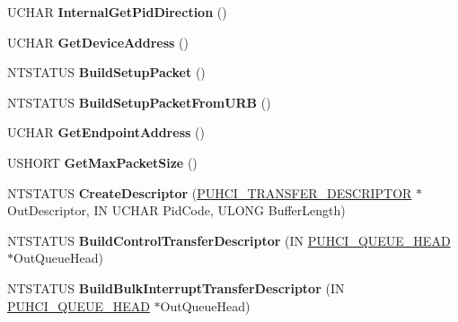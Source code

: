 \begin{DoxyCompactItemize}
\item 
\mbox{\label{class_c_u_s_b_request_a907750f1eae3e8941ed48e267dfa065c}} 
U\+C\+H\+AR {\bfseries Internal\+Get\+Pid\+Direction} ()
\item 
\mbox{\label{class_c_u_s_b_request_a4efd7319fed4233a64a3b07bab79f8eb}} 
U\+C\+H\+AR {\bfseries Get\+Device\+Address} ()
\item 
\mbox{\label{class_c_u_s_b_request_a3b5a481af7c99db9a583bd1442a338f7}} 
N\+T\+S\+T\+A\+T\+US {\bfseries Build\+Setup\+Packet} ()
\item 
\mbox{\label{class_c_u_s_b_request_a368b9e19db90a8cbcc7308c47b559034}} 
N\+T\+S\+T\+A\+T\+US {\bfseries Build\+Setup\+Packet\+From\+U\+RB} ()
\item 
\mbox{\label{class_c_u_s_b_request_aa3ece5c8123ef906c134eeb3ada68c25}} 
U\+C\+H\+AR {\bfseries Get\+Endpoint\+Address} ()
\item 
\mbox{\label{class_c_u_s_b_request_ac79908e17dcded7104b9c2d4cc77d38d}} 
U\+S\+H\+O\+RT {\bfseries Get\+Max\+Packet\+Size} ()
\item 
\mbox{\label{class_c_u_s_b_request_abb2fcd2a0ad93e424d2d3fb0449bf6f4}} 
N\+T\+S\+T\+A\+T\+US {\bfseries Create\+Descriptor} (\hyperlink{struct___u_h_c_i___t_r_a_n_s_f_e_r___d_e_s_c_r_i_p_t_o_r}{P\+U\+H\+C\+I\+\_\+\+T\+R\+A\+N\+S\+F\+E\+R\+\_\+\+D\+E\+S\+C\+R\+I\+P\+T\+OR} $\ast$Out\+Descriptor, IN U\+C\+H\+AR Pid\+Code, U\+L\+O\+NG Buffer\+Length)
\item 
\mbox{\label{class_c_u_s_b_request_ab3b3eb91262cdad03869595595e30e8c}} 
N\+T\+S\+T\+A\+T\+US {\bfseries Build\+Control\+Transfer\+Descriptor} (IN \hyperlink{struct___u_h_c_i___q_u_e_u_e___h_e_a_d}{P\+U\+H\+C\+I\+\_\+\+Q\+U\+E\+U\+E\+\_\+\+H\+E\+AD} $\ast$Out\+Queue\+Head)
\item 
\mbox{\label{class_c_u_s_b_request_a9b93f021debab6de582b2a68becaad66}} 
N\+T\+S\+T\+A\+T\+US {\bfseries Build\+Bulk\+Interrupt\+Transfer\+Descriptor} (IN \hyperlink{struct___u_h_c_i___q_u_e_u_e___h_e_a_d}{P\+U\+H\+C\+I\+\_\+\+Q\+U\+E\+U\+E\+\_\+\+H\+E\+AD} $\ast$Out\+Queue\+Head)

\end{DoxyCompactItemize}
